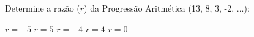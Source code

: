 Determine a razão ($r$) da Progressão Aritmética (13, 8, 3, -2, ...):

$r=-5$
$r=5$
$r=-4$
$r=4$
$r=0$




